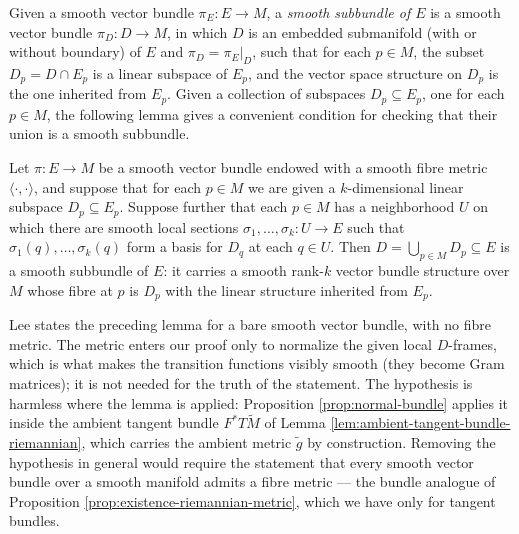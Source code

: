 Given a smooth vector bundle $\pi_E: E \to M$, a \textit{smooth subbundle of $E$} is a smooth vector bundle $\pi_D: D \to M$, in which $D$ is an embedded submanifold (with or without boundary) of $E$ and $\pi_D = \pi_E|_D$, such that for each $p \in M$, the subset $D_p = D \cap E_p$ is a linear subspace of $E_p$, and the vector space structure on $D_p$ is the one inherited from $E_p$. Given a collection of subspaces $D_p \subseteq E_p$, one for each $p \in M$, the following lemma gives a convenient condition for checking that their union is a smooth subbundle.

\begin{lemma}
\label{lem:local-frame-criterion-for-subbundles}





Let $\pi: E \to M$ be a smooth vector bundle endowed with a smooth fibre metric $\langle\cdot,\cdot\rangle$, and suppose that for each $p \in M$ we are given a $k$-dimensional linear subspace $D_p \subseteq E_p$. Suppose further that each $p \in M$ has a neighborhood $U$ on which there are smooth local sections $\sigma_1, \ldots, \sigma_k: U \to E$ such that $\sigma_1(q), \ldots, \sigma_k(q)$ form a basis for $D_q$ at each $q \in U$. Then $D = \bigcup_{p \in M} D_p \subseteq E$ is a smooth subbundle of $E$: it carries a smooth rank-$k$ vector bundle structure over $M$ whose fibre at $p$ is $D_p$ with the linear structure inherited from $E_p$.
\end{lemma}

\begin{remark}
\label{rem:subbundle-criterion-metric}

Lee states the preceding lemma for a bare smooth vector bundle, with no fibre metric. The metric enters our proof only to normalize the given local $D$-frames, which is what makes the transition functions visibly smooth (they become Gram matrices); it is not needed for the truth of the statement. The hypothesis is harmless where the lemma is applied: Proposition \ref{prop:normal-bundle} applies it inside the ambient tangent bundle $F^*T\tilde M$ of Lemma \ref{lem:ambient-tangent-bundle-riemannian}, which carries the ambient metric $\tilde g$ by construction. Removing the hypothesis in general would require the statement that every smooth vector bundle over a smooth manifold admits a fibre metric --- the bundle analogue of Proposition \ref{prop:existence-riemannian-metric}, which we have only for tangent bundles.
\end{remark}

